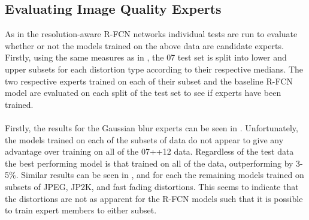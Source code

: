 \subsection{Evaluating Image Quality Experts}\label{sec:iq_experts}
As in the resolution-aware R-FCN networks individual tests are run to evaluate whether or not the models trained on the above data are candidate experts. Firstly, using the same measures as in , the 07 test set is split into lower and upper subsets for each distortion type according to their respective medians. The two respective experts trained on each of their subset and the baseline R-FCN model are evaluated on each split of the test set to see if experts have been trained.
\\\\
Firstly, the results for the Gaussian blur experts can be seen in . Unfortunately, the models trained on each of the subsets of data do not appear to give any advantage over training on all of the 07++12 data. Regardless of the test data the best performing model is that trained on all of the data, outperforming by 3-5\%. Similar results can be seen in ,  and  for each the remaining models trained on subsets of JPEG, JP2K, and fast fading distortions. This seems to indicate that the distortions are not as apparent for the R-FCN models such that it is possible to train expert members to either subset.

